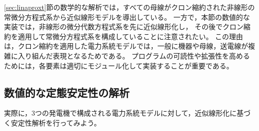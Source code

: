 \documentclass[tombow,dvipdfmx]{corona-a5-1.1}
\begin{document}
\ref{sec:linaproxt}節の数学的な解析では，すべての母線がクロン縮約された非線形の常微分方程式系から近似線形モデルを導出している。
一方で，本節の数値的な実装では，非線形の微分代数方程式系を先に近似線形化し，
その後でクロン縮約を適用して常微分方程式系を構成していることに注意されたい。
この理由は，クロン縮約を適用した電力系統モデルでは，一般に機器や母線，送電線が複雑に入り組んだ表現となるためである。
プログラムの可読性や拡張性を高めるためには，各要素は適切にモジュール化して実装することが重要である。


\subsection{数値的な定態安定性の解析}

実際に，3つの発電機で構成される電力系統モデルに対して，近似線形化に基づく安定性解析を行ってみよう。

%
\end{document}
